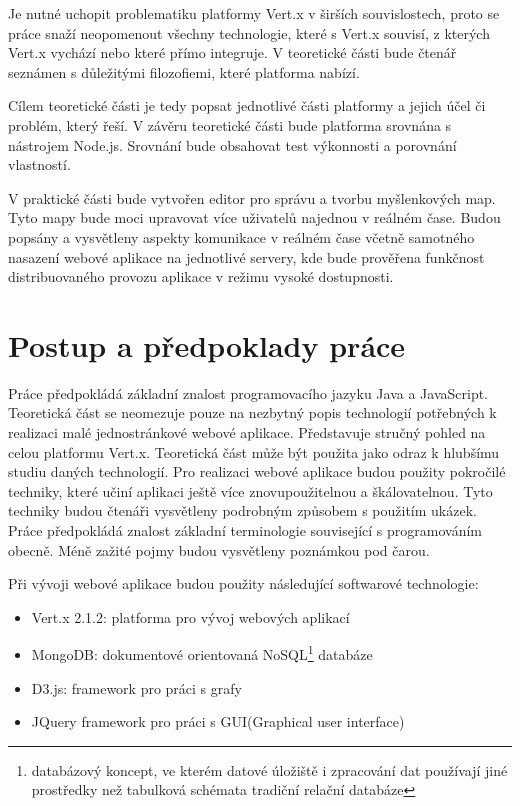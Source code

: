 Je nutné uchopit problematiku platformy Vert.x v širších souvislostech, proto se práce snaží neopomenout všechny technologie, které s Vert.x souvisí, z kterých Vert.x vychází nebo které přímo integruje. V teoretické části bude čtenář seznámen s důležitými filozofiemi, které platforma nabízí. %

Cílem teoretické části je tedy popsat jednotlivé části platformy a jejich účel či problém, který řeší. V závěru teoretické části bude platforma srovnána s nástrojem Node.js. Srovnání bude obsahovat test výkonnosti a porovnání vlastností.

V praktické části bude vytvořen editor pro správu a tvorbu myšlenkových map. Tyto mapy bude moci upravovat více uživatelů najednou v reálném čase. Budou popsány a vysvětleny aspekty komunikace v reálném čase včetně samotného nasazení webové aplikace na jednotlivé servery, kde bude prověřena funkčnost distribuovaného provozu aplikace v režimu vysoké dostupnosti.

\section{Postup a předpoklady práce}

Práce předpokládá základní znalost programovacího jazyku Java a JavaScript. Teoretická část se neomezuje pouze na nezbytný popis technologií potřebných k realizaci malé jednostránkové webové aplikace. Představuje stručný pohled na celou platformu Vert.x. Teoretická část může být použita jako odraz k hlubšímu studiu daných technologií. Pro realizaci webové aplikace budou použity pokročilé techniky, které učiní aplikaci ještě více znovupoužitelnou a škálovatelnou. Tyto techniky budou čtenáři vysvětleny podrobným způsobem s použitím ukázek. Práce předpokládá znalost základní terminologie související s programováním obecně. Méně zažité pojmy budou vysvětleny poznámkou pod čarou.

Při vývoji webové aplikace budou použity následující softwarové technologie:
\begin{itemize}
\item Vert.x 2.1.2: platforma pro vývoj webových aplikací
\item MongoDB: dokumentové orientovaná NoSQL\footnote{databázový koncept, ve kterém datové úložiště i zpracování dat používají jiné prostředky než tabulková schémata tradiční relační databáze} databáze
\item D3.js: framework pro práci s grafy
\item JQuery framework pro práci s GUI(Graphical user interface)
\end{itemize}